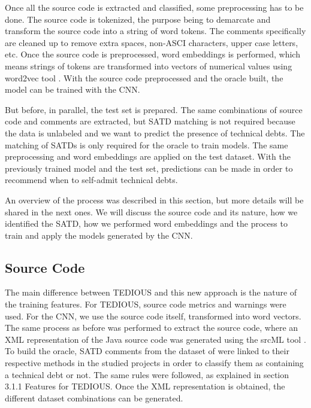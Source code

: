 Once all the source code is extracted and classified, some preprocessing has to be done. The source code is tokenized, the purpose being to demarcate and transform the source code into a string of word tokens. The comments specifically are cleaned up to remove extra spaces, non-ASCI characters, upper case letters, etc. Once the source code is preprocessed, word embeddings is performed, which means strings of tokens are transformed into vectors of numerical values using word2vec tool \citep{word2vec}. With the source code preprocessed and the oracle built, the model can be trained with the CNN.

But before, in parallel, the test set is prepared. The same combinations of source code and comments are extracted, but SATD matching is not required because the data is unlabeled and we want to predict the presence of technical debts. The matching of SATDs is only required for the oracle to train models. The same preprocessing and word embeddings are applied on the test dataset. With the previously trained model and the test set, predictions can be made in order to recommend when to self-admit technical debts.

An overview of the process was described in this section, but more details will be shared in the next ones. We will discuss the source code and its nature, how we identified the SATD, how we performed word embeddings and the process to train and apply the models generated by the CNN.

\subsection{Source Code}


The main difference between TEDIOUS and this new approach is the nature of the training features. For TEDIOUS, source code metrics and warnings were used. For the CNN, we use the source code itself, transformed into word vectors. The same process as before was performed to extract the source code, where an XML representation of the Java source code was generated using the srcML tool \citep{Collard2013}. To build the oracle, SATD comments from the dataset of \citet{MaldonadoNLP} were linked to their respective methods in the studied projects in order to classify them as containing a technical debt or not. The same rules were followed, as explained in section 3.1.1 Features for TEDIOUS. Once the XML representation is obtained, the different dataset combinations can be generated.

